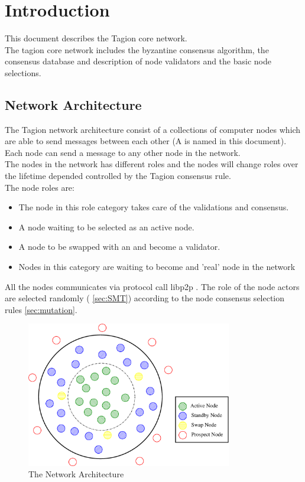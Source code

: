 \section{Introduction}

This document describes the Tagion core network.\\
The tagion core network includes the byzantine consensus algorithm, the consensus database and description of node validators and the basic node selections. 

\subsection{Network Architecture}
The Tagion network architecture consist of a collections of computer nodes which are able to send messages between each other (A  is named  in this document). Each node can send a message to any other node in the network.\\
The nodes in the network has different roles and the nodes will change roles over the lifetime depended controlled by the Tagion consensus rule.\\ 

The node roles are:
\begin{itemize}
	\item[\bfit{Active Node}] The node in this role category takes care of the validations and consensus.
	\item[\bfit{Standby Node}] A node waiting to be selected as an active node.
	\item[\bfit{Swap Node}] A node to be swapped with an  and become a validator.  
	\item[\bfit{Prospect Node}] Nodes in this category are waiting to become and 'real' node in the network 
	\label{tab:node_roles}
\end{itemize}

All the nodes communicates via protocol call libp2p \cite{libp2p}. The role of the node actors are selected randomly ( \cref{sec:SMT}) according to the node consensus selection rules \cref{sec:mutation}.

\begin{figure}[H]
	\centering
	\includegraphics[width=0.8\textwidth]{fig/network_architecture.eps}
	\caption{The Network Architecture}

	\label{fig:network_architecture}
\end{figure}

